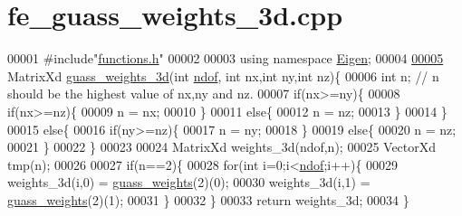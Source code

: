 \hypertarget{fe__guass__weights__3d_8cpp_source}{}\section{fe\+\_\+guass\+\_\+weights\+\_\+3d.\+cpp}
\label{fe__guass__weights__3d_8cpp_source}

\begin{DoxyCode}
00001 \textcolor{preprocessor}{#include"\hyperlink{functions_8h}{functions.h}"}
00002 
00003 \textcolor{keyword}{using namespace }\hyperlink{namespace_eigen}{Eigen};
00004 
\hyperlink{fe__guass__weights__3d_8cpp_ad99b08ce65ae353e91486d7685c22024}{00005} MatrixXd \hyperlink{fe__guass__weights__3d_8cpp_ad99b08ce65ae353e91486d7685c22024}{guass\_weights\_3d}(\textcolor{keywordtype}{int} \hyperlink{_global_variables_8h_aa789fe4d8a13fd0990b630909430d5d0}{ndof}, \textcolor{keywordtype}{int} nx,\textcolor{keywordtype}{int} ny,\textcolor{keywordtype}{int} nz)\{
00006     \textcolor{keywordtype}{int} n; \textcolor{comment}{// n should be the highest value of nx,ny and nz.}
00007     \textcolor{keywordflow}{if}(nx>=ny)\{
00008         \textcolor{keywordflow}{if}(nx>=nz)\{
00009             n = nx;
00010         \}
00011         \textcolor{keywordflow}{else}\{
00012             n = nz;
00013         \}
00014     \}
00015     \textcolor{keywordflow}{else}\{
00016         \textcolor{keywordflow}{if}(ny>=nz)\{
00017             n = ny;
00018         \}
00019         \textcolor{keywordflow}{else}\{
00020         n = nz;
00021         \}
00022     \}
00023 
00024     MatrixXd weights\_3d(ndof,n);
00025     VectorXd tmp(n);
00026 
00027     \textcolor{keywordflow}{if}(n==2)\{
00028         \textcolor{keywordflow}{for}(\textcolor{keywordtype}{int} i=0;i<\hyperlink{_global_variables_8h_aa789fe4d8a13fd0990b630909430d5d0}{ndof};i++)\{
00029             weights\_3d(i,0) = \hyperlink{functions_8h_a84dcc9575e861bdb2872c10ba6238ee4}{guass\_weights}(2)(0);
00030             weights\_3d(i,1) = \hyperlink{functions_8h_a84dcc9575e861bdb2872c10ba6238ee4}{guass\_weights}(2)(1);
00031         \}
00032     \}
00033     \textcolor{keywordflow}{return} weights\_3d;
00034 \}
\end{DoxyCode}
